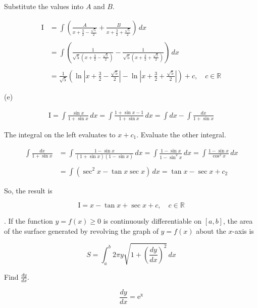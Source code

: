 \documentclass{article}
\begin{document}
\hfill

\noindent Substitute the values into $A$ and $B$.

\begin{align*}\mathrm{I}&=\int\left(\frac A{x+\frac32-\frac{\sqrt5}2}+\frac B{x+\frac32+\frac{\sqrt5}2}\right)\,dx\\\\&=\int\left(\frac1{\sqrt5\left(x+\frac32-\frac{\sqrt5}2\right)}-\frac1{\sqrt5\left(x+\frac32+\frac{\sqrt5}2\right)}\right)\,dx\\\\&=\boxed{\frac1{\sqrt5}\left(\ln\left|x+\frac32-\frac{\sqrt5}2\right|-\ln\left|x+\frac32+\frac{\sqrt5}2\right|\right)+c,\quad c\in\mathbb{R}}\end{align*}

\hfill

\noindent (e)

\begin{align*}\mathrm{I}=\int\frac{\sin x}{1+\sin x}\,dx=\int\frac{1+\sin x-1}{1+\sin x}\,dx=\int dx-\int\frac{dx}{1+\sin x}\end{align*}

\hfill

\noindent The integral on the left evaluates to $x+c_1$. Evaluate the other integral.

\begin{align*}\int\frac{dx}{1+\sin x}&=\int\frac{1-\sin x}{(1+\sin x)(1-\sin x)}\,dx=\int\frac{1-\sin x}{1-\sin^2x}\,dx=\int\frac{1-\sin x}{\cos^2x}\,dx\\\\&=\int\left(\sec^2x-\tan x\sec x\right)\,dx=\tan x-\sec x+c_2\end{align*}

\hfill

\noindent So, the result is

\[\mathrm{I}=\boxed{x-\tan x+\sec x+c,\quad c\in\mathbb{R}}\]

\hfill

. If the function $y=f(x)\geq0$ is continuously differentiable on $[a,b]$, the area of the surface generated by revolving the graph of $y=f(x)$ about the $x$-axis is

\[S=\int_a^b2\pi y\sqrt{1+\left(\frac{dy}{dx}\right)^2}\,dx\]

\hfill

\noindent Find $\displaystyle\frac{dy}{dx}$.

\[\frac{dy}{dx}=\mathrm{e^x}\]

\hfill
\end{document}
